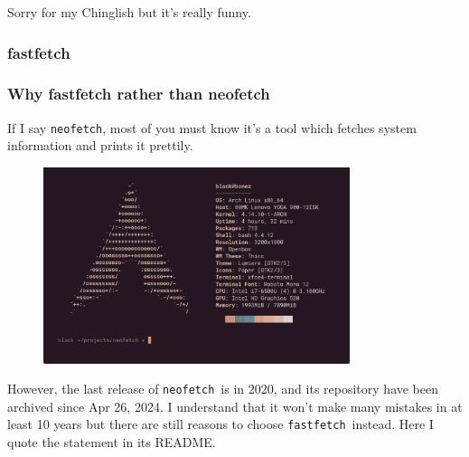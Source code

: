 \documentclass[12pt]{ctexart}
\newenvironment{mdquote}
{%
  \par\noindent
  \begin{list}{}{%
      \setlength{\leftmargin}{1em}%
      \setlength{\rightmargin}{0pt}%
      \setlength{\itemindent}{0pt}%
      \setlength{\listparindent}{\parindent}%
      \setlength{\topsep}{0.5\baselineskip}%
  }
  \item[\textbf{>}\ ]\itshape
}
{\end{list}\par}
\begin{document}
\begin{mdquote}
Sorry for my Chinglish but it's really funny.
\end{mdquote}

\subsubsection{\textbf{fastfetch}}

\subsubsection*{\textbf{Why fastfetch rather than neofetch}}

If I say \texttt{neofetch}, most of you must know it's a
tool which fetches system information and prints it prettily.

\begin{figure}[H]
    \centering
    \includegraphics[width=0.8\textwidth,keepaspectratio]{assets/Linux/2.6 The way to pretend B/1.png}
\end{figure}

However, the last release of \texttt{neofetch}\ is in 2020, and its
repository have been archived since Apr 26, 2024. I understand that it
won't make many mistakes in at least 10 years but there
are still reasons to choose \texttt{fastfetch}\ instead. Here I quote the
statement in its README.
\end{document}
